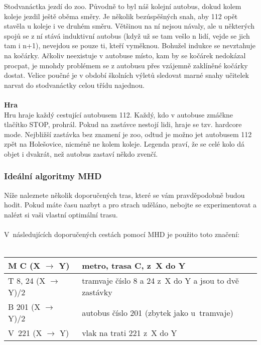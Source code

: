 Stodvanáctka jezdí do zoo. Původně to byl náš kolejní autobus, dokud kolem
koleje jezdil ještě oběma směry. Je několik bezúspěšných snah, aby 112 opět
stavěla u koleje i ve druhém směru. Většinou na ní nejsou návaly, ale u
některých spojů se z ní stává induktivní autobus (když už se tam vešlo n lidí,
vejde se jich tam i n+1), nevejdou se pouze ti, kteří vyměknou. Bohužel indukce
se nevztahuje na kočárky. Ačkoliv neexistuje v autobuse místo, kam by se kočárek
nedokázal procpat, je mnohdy problémem se z autobusu přes vzájemně zaklíněné
kočárky dostat. Velice poučné je v období školních výletů sledovat marné snahy
učitelek narvat do stodvanáctky celou třídu najednou.
\\\\
\textbf{Hra}
\\
Hru hraje každý cestující autobusem 112. Každý, kdo v autobuse zmáčkne tlačítko
STOP, prohrál. Pokud na zastávce nestojí lidi, hraje se tzv. hardcore mode.
Nejbližší zastávka bez znamení je zoo, odtud je možno jet autobusem 112 zpět na
Holešovice, nicméně ne kolem koleje. Legenda praví, že se celé kolo dá objet i
dvakrát, než autobus zastaví někdo zvenčí.


\subsubsection{Ideální algoritmy MHD}
Níže naleznete několik doporučených tras, které se vám pravděpodobně budou
hodit. Pokud máte času nazbyt a pro strach uděláno, nebojte se experimentovat a
nalézt si vaši vlastní optimální trasu.
\\\\
V~následujících doporučených cestách pomocí MHD je použito toto
značení:
\\\\
\begin{tabularx}{\textwidth}{ |l|X| }
\hline
M C (X $\rightarrow$ Y) & metro, trasa C, z~X do Y \\
\hline
T 8, 24 (X $\rightarrow$ Y)/2 & tramvaje číslo 8 a 24 z~X do Y a jsou to dvě
zastávky \\
\hline
B 201 (X $\rightarrow$ Y)/2 & autobus číslo 201 (zbytek jako u~tramvaje)\\
\hline
V~221 (X $\rightarrow$ Y) & vlak na trati 221 z~X do Y \\
\hline
\end{tabularx}

